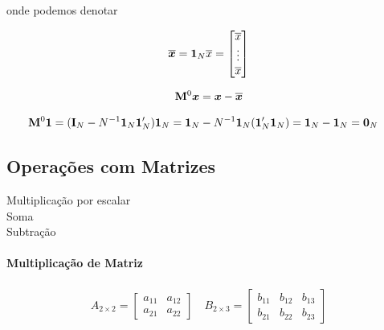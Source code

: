 \documentclass[11pt, oneside, a4paper, article]{article}
\numberwithin{equation}{section}
\begin{document}
\begin{description}
\noindent
onde podemos denotar

\vspace{-1 em}
\begin{align*}
\overline{\boldsymbol{x}} 	=
\boldsymbol{1}_{N} \overline{x}	=
\begin{bmatrix}
	\overline{x} \\ \vdots \\ \overline{x}
\end{bmatrix}
\end{align*}

\vspace{-1 em}
\begin{align*}
\mathbf{M}^{0} \boldsymbol{x} 	= 	\boldsymbol{x} - \overline{\boldsymbol{x}} 
\end{align*}

\vspace{-1 em}
\begin{align*}
\mathbf{M}^{0} \boldsymbol{1} &= ( \mathbf{I}_{N} - N^{-1} \boldsymbol{1}_{N} \boldsymbol{1}_{N}' ) \boldsymbol{1}_{N}	= 
\boldsymbol{1}_{N} - N^{-1} \boldsymbol{1}_{N} (\boldsymbol{1}_{N}' \boldsymbol{1}_{N})	= \boldsymbol{1}_{N} - \boldsymbol{1}_{N}	= \boldsymbol{0}_{N} 
\end{align*}

\subsection{Operações com Matrizes}

\begin{description}
	\item[Multiplicação por escalar] 
	\item[Soma] 
	\item[Subtração] 
\end{description}

\paragraph{Multiplicação de Matriz}

\begin{align*}
	A_{2 \times 2} =
	\begin{bmatrix}
		a_{11} & a_{12} \\
		a_{21} & a_{22}		
	\end{bmatrix}
	\quad
	B_{2 \times 3} =
	\begin{bmatrix}
		b_{11} & b_{12} & b_{13} \\
		b_{21} & b_{22} & b_{23}		
	\end{bmatrix}
\end{align*}


\end{description}
\end{document}
